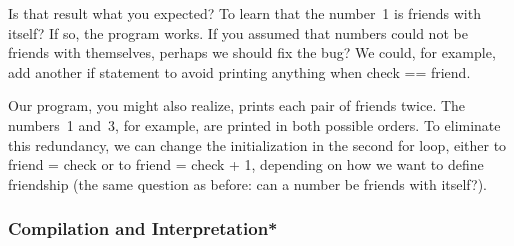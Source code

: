 Is that result what you expected?  To learn that the number~1 is
friends with itself?  If so, the program works.  If you assumed that
numbers could not be friends with themselves, perhaps we should fix the 
bug?  We could, for example, add another {\tfix if} statement to 
avoid printing anything when {\tfix check == friend}.

Our program, you might also realize, prints each pair of friends twice.
The numbers~1 and~3, for example, are printed in both possible orders.  To
eliminate this redundancy, we can change the initialization in the 
second {\tfix for} loop, either to {\tfix friend = check} or to
{\tfix friend = check + 1}, depending on how we want to define friendship
(the same question as before: can a number be friends with itself?).\\

\pagebreak

\subsubsection{Compilation and Interpretation*}

